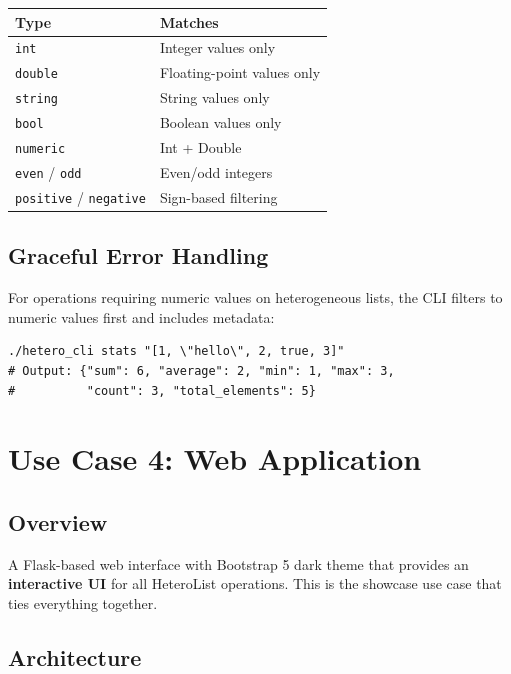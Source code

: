\documentclass[11pt,a4paper]{article}
\begin{document}
\begin{center}
\begin{tabular}{|l|l|}
\hline
\textbf{Type} & \textbf{Matches} \\
\hline
\texttt{int} & Integer values only \\
\texttt{double} & Floating-point values only \\
\texttt{string} & String values only \\
\texttt{bool} & Boolean values only \\
\texttt{numeric} & Int + Double \\
\texttt{even} / \texttt{odd} & Even/odd integers \\
\texttt{positive} / \texttt{negative} & Sign-based filtering \\
\hline
\end{tabular}
\end{center}

\subsection{Graceful Error Handling}

For operations requiring numeric values on heterogeneous lists, the CLI filters to numeric values first and includes metadata:

\begin{verbatim}
./hetero_cli stats "[1, \"hello\", 2, true, 3]"
# Output: {"sum": 6, "average": 2, "min": 1, "max": 3, 
#          "count": 3, "total_elements": 5}
\end{verbatim}

\section{Use Case 4: Web Application}

\subsection{Overview}

A Flask-based web interface with Bootstrap 5 dark theme that provides an \textbf{interactive UI} for all HeteroList operations. This is the showcase use case that ties everything together.

\subsection{Architecture}
\end{document}
